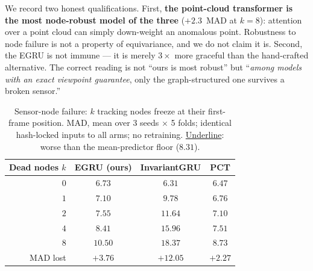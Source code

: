 \documentclass[10pt,journal]{IEEEtran}
\begin{document}
We record two honest qualifications. First, \textbf{the point-cloud transformer is the most
node-robust model of the three} ($+2.3$~MAD at $k=8$): attention over a point cloud can simply
down-weight an anomalous point. Robustness to node failure is not a property of equivariance, and we
do not claim it is. Second, the EGRU is not immune --- it is merely $3\times$ more graceful than the
hand-crafted alternative. The correct reading is not ``ours is most robust'' but ``\emph{among models
with an exact viewpoint guarantee}, only the graph-structured one survives a broken sensor.''

\begin{table}[!t]
\centering
\caption{Sensor-node failure: $k$ tracking nodes freeze at their first-frame position. MAD, mean over
3 seeds $\times$ 5 folds; identical hash-locked inputs to all arms; no retraining. \underline{Underline}:
worse than the mean-predictor floor ($8.31$).}
\label{tab:nodefail}
\small
\begin{tabular}{rccc}
\toprule
Dead nodes $k$ & EGRU (ours) & InvariantGRU & PCT \\
\midrule
$0$ & $6.73$ & $6.31$ & $6.47$ \\
$1$ & $7.10$ & \underline{$9.78$}  & $6.76$ \\
$2$ & $7.55$ & \underline{$11.64$} & $7.10$ \\
$4$ & $8.41$ & \underline{$15.96$} & $7.51$ \\
$8$ & \underline{$10.50$} & \underline{$18.37$} & $8.73$ \\
\midrule
MAD lost & $+3.76$ & $+12.05$ & $\mathbf{+2.27}$ \\
\bottomrule
\end{tabular}
\end{table}
\end{document}
